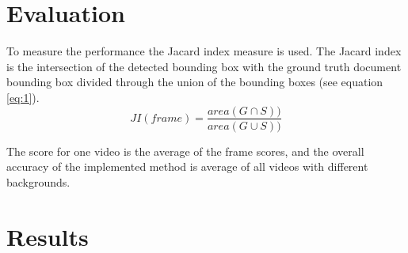 \documentclass[english, paper=a4]{scrartcl}
\begin{document}
\section{Evaluation}
To measure the performance the Jacard index measure \cite{everingham2010pascal} is used. 
The Jacard index is the intersection of the detected bounding box with the ground truth document bounding box divided through the union of the bounding boxes (see equation \ref{eq:1}).
\begin{equation}\label{eq:1}
JI(frame)= \frac{area(G\cap S))}{area(G\cup S))}
\end{equation}

The score for one video is the average of the frame scores, and the overall accuracy of the implemented method is average of all videos with different backgrounds.

\section{Results}

\newpage


\end{document}
